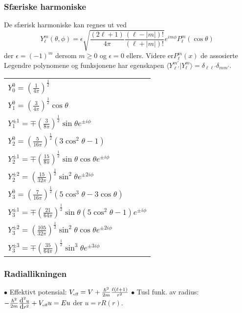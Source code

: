 \documentclass[a4paper, norsk, 8pt]{article}
\newcommand{\braket}[2] { \langle #1 | #2 \rangle }
\begin{document}
\begin{multicols*}{3}
\subsubsection*{\scriptsize Sfæriske harmoniske}
De sfærisk harmoniske kan regnes ut ved \[Y_\ell^m(\theta,\phi)=\epsilon\sqrt{\frac{(2\ell+1)}{4\pi}\frac{(\ell-|m|)!}{(\ell+|m|)!}}e^{im\phi}P_\ell^m(\cos \theta)\] der $\epsilon=(-1)^m$ dersom $m\geq 0$ og $\epsilon=0$ ellers. Videre er$P_\ell^m(x)$ de assosierte Legendre polynomene og funksjonene har egenskapen $\braket{Y_{\ell'}^{m'}}{Y_\ell^m}=\delta_{\ell \ell'}\delta_{mm'}$.\\
\begin{tabular}{|l|}
\hline
$Y_0^0=\left(\frac{1}{4\pi}\right)^\frac{1}{2}$								\\
$Y_1^0=\left(\frac{3}{4\pi}\right)^\frac{1}{2}\cos \theta$ 					\\ 
$Y_1^{\pm1}=\mp \left(\frac{3}{8\pi}\right)^\frac{1}{2}\sin \theta e^{\pm i \phi}$				\\
$Y_2^0=\left(\frac{5}{16\pi}\right)^\frac{1}{2}(3\cos^2\theta-1)$ 				\\ 
$Y_2^{\pm1}=\mp\left(\frac{15}{8\pi}\right)^\frac{1}{2}\sin \theta \cos \theta e^{\pm i \phi}$				\\
$Y_2^{\pm 2}=\left(\frac{15}{32\pi}\right)^\frac{1}{2} \sin^2 \theta e^{\pm 2 i \phi}$ 				\\ 
$Y_3^0=\left(\frac{7}{16\pi}\right)^\frac{1}{2}(5\cos^3 \theta-3\cos \theta)$				\\
$Y_3^{\pm 1}=\mp\left(\frac{21}{64\pi}\right)^\frac{1}{2}\sin\theta(5 \cos^2 \theta-1)e^{\pm i \phi}$ 				\\
$Y_3^{\pm 2}=\left(\frac{105}{32\pi}\right)^\frac{1}{2}\sin^2 \theta \cos \theta e^{\pm 2i \phi}$				\\
$Y_3^{\pm 3}=\mp \left(\frac{35}{64\pi}\right)^\frac{1}{2} \sin^3 \theta e^{\pm 3i\phi}$ 				\\  \hline
\end{tabular} 


\subsubsection*{\scriptsize Radiallikningen}
$\bullet$ Effektivt potensial: $V_{\tiny \mbox{eff}}=V+\frac{\hbar^2}{2m}\frac{\ell(\ell+1)}{r^2}$ 
$\bullet$ Tusl funk. av radius: $-\frac{\hbar^2}{2m}\frac{\mbox{d}^2u}{\mbox{d}r^2}+V_{\tiny \mbox{eff}}u=Eu$ der $u=rR(r)$. 



\end{multicols*}
\end{document}
